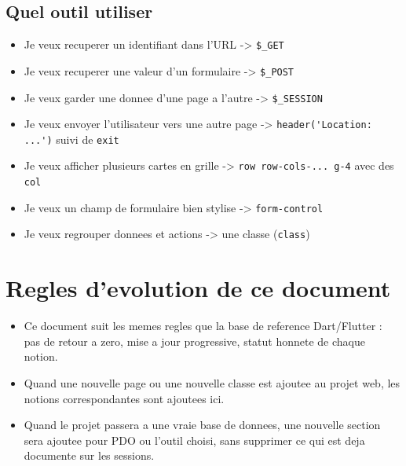 \documentclass[11pt,a4paper]{article}
\begin{document}
\subsection{Quel outil utiliser}

\begin{itemize}
  \item Je veux recuperer un identifiant dans l'URL -> \verb|$_GET|
  \item Je veux recuperer une valeur d'un formulaire -> \verb|$_POST|
  \item Je veux garder une donnee d'une page a l'autre -> \verb|$_SESSION|
  \item Je veux envoyer l'utilisateur vers une autre page -> \verb|header('Location: ...')| suivi de \verb|exit|
  \item Je veux afficher plusieurs cartes en grille -> \verb|row row-cols-... g-4| avec des \verb|col|
  \item Je veux un champ de formulaire bien stylise -> \verb|form-control|
  \item Je veux regrouper donnees et actions -> une classe (\verb|class|)
\end{itemize}

\section{Regles d'evolution de ce document}

\begin{itemize}
  \item Ce document suit les memes regles que la base de reference
  Dart/Flutter : pas de retour a zero, mise a jour progressive, statut
  honnete de chaque notion.
  \item Quand une nouvelle page ou une nouvelle classe est ajoutee au projet
  web, les notions correspondantes sont ajoutees ici.
  \item Quand le projet passera a une vraie base de donnees, une nouvelle
  section sera ajoutee pour PDO ou l'outil choisi, sans supprimer ce qui est
  deja documente sur les sessions.
\end{itemize}
\end{document}
